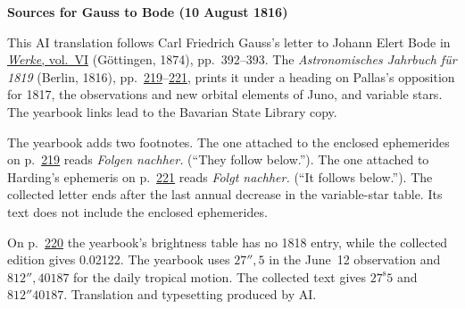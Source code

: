 \clearpage\thispagestyle{empty}
\begin{center}\textbf{Sources for Gauss to Bode (10 August 1816)}\end{center}
\noindent This AI translation follows Carl Friedrich Gauss’s letter to Johann Elert Bode in \href{https://gdz.sub.uni-goettingen.de/id/PPN236007467}{\textit{Werke}, vol.~VI} (Göttingen, 1874), pp.~392--393. The \textit{Astronomisches Jahrbuch für 1819} (Berlin, 1816), pp.~\href{https://api.digitale-sammlungen.de/iiif/image/v2/bsb10538348_00225/full/1600,/0/default.jpg}{219}--\href{https://api.digitale-sammlungen.de/iiif/image/v2/bsb10538348_00227/full/1600,/0/default.jpg}{221}, prints it under a heading on Pallas’s opposition for 1817, the observations and new orbital elements of Juno, and variable stars. The yearbook links lead to the Bavarian State Library copy.
\par\smallskip\noindent The yearbook adds two footnotes. The one attached to the enclosed ephemerides on p.~\href{https://api.digitale-sammlungen.de/iiif/image/v2/bsb10538348_00225/full/1600,/0/default.jpg}{219} reads \textit{Folgen nachher.} (“They follow below.”). The one attached to Harding’s ephemeris on p.~\href{https://api.digitale-sammlungen.de/iiif/image/v2/bsb10538348_00227/full/1600,/0/default.jpg}{221} reads \textit{Folgt nachher.} (“It follows below.”). The collected letter ends after the last annual decrease in the variable-star table. Its text does not include the enclosed ephemerides.
\par\smallskip\noindent On p.~\href{https://api.digitale-sammlungen.de/iiif/image/v2/bsb10538348_00226/full/1600,/0/default.jpg}{220} the yearbook’s brightness table has no 1818 entry, while the collected edition gives 0.02122. The yearbook uses $27''{,}5$ in the June~12 observation and $812''{,}40187$ for the daily tropical motion. The collected text gives $27^{\mathrm s}5$ and $812''40187$. Translation and typesetting produced by AI.
\clearpage
